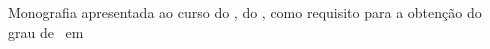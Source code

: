 \begin{flushright}
    \begin{minipage}{0.5\textwidth}
    Monografia apresentada ao curso \nomedocurso \hspace{1mm}do \dep, do \instituto, como requisito para a obtenção do grau de \titulacao \ em \nomedocurso
    \end{minipage}
    
    \vspace*{0.2in}
    
    \begin{minipage}{0.5\textwidth}
       \begin{minipage}[t]{0.35\textwidth}
        \genorientador
       \end{minipage}
       \begin{minipage}[t]{0.6\textwidth}
        \orientador
       \end{minipage}\\
       
       \begin{minipage}[t]{0.35\textwidth}
        \coorientador
       \end{minipage}
       \begin{minipage}[t]{0.6\textwidth}
        \nomecoorientador
       \end{minipage}
    \end{minipage}

\end{flushright}
\vspace*{1in}

\begin{center}
    \Month \\ \the\year
\end{center}